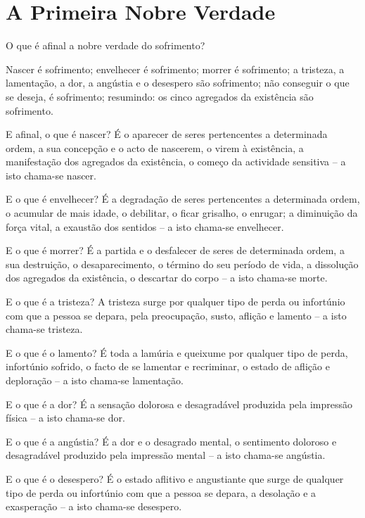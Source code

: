 
\chapter{A Primeira Nobre Verdade}


O que é afinal a nobre verdade do sofrimento?

Nascer é sofrimento; envelhecer é sofrimento; morrer é sofrimento; a tristeza, a
lamentação, a dor, a angústia e o desespero são sofrimento; não conseguir o que
se deseja, é sofrimento; resumindo: os cinco agregados da existência são
sofrimento.

E afinal, o que é nascer? É o aparecer de seres pertencentes a determinada
ordem, a sua concepção e o acto de nascerem, o virem à existência, a
manifestação dos agregados da existência, o começo da actividade sensitiva -- a
isto chama-se nascer.

E o que é envelhecer? É a degradação de seres pertencentes a determinada ordem,
o acumular de mais idade, o debilitar, o ficar grisalho, o enrugar; a diminuição
da força vital, a exaustão dos sentidos -- a isto chama-se envelhecer.

E o que é morrer? É a partida e o desfalecer de seres de determinada ordem, a
sua destruição, o desaparecimento, o término do seu período de vida, a
dissolução dos agregados da existência, o descartar do corpo -- a isto chama-se
morte.

E o que é a tristeza? A tristeza surge por qualquer tipo de perda ou infortúnio
com que a pessoa se depara, pela preocupação, susto, aflição e lamento -- a isto
chama-se tristeza.

E o que é o lamento? É toda a lamúria e queixume por qualquer tipo de perda,
infortúnio sofrido, o facto de se lamentar e recriminar, o estado de aflição e
deploração -- a isto chama-se lamentação.

E o que é a dor? É a sensação dolorosa e desagradável produzida pela impressão
física -- a isto chama-se dor.

E o que é a angústia? É a dor e o desagrado mental, o sentimento doloroso e
desagradável produzido pela impressão mental -- a isto chama-se angústia.

E o que é o desespero? É o estado aflitivo e angustiante que surge de qualquer
tipo de perda ou infortúnio com que a pessoa se depara, a desolação e a
exasperação -- a isto chama-se desespero.

